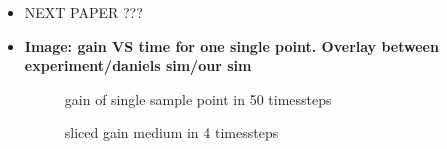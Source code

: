 \begin{itemize}

  \item NEXT PAPER ???

  \item \textbf{Image: gain VS time for one single point. Overlay between
    experiment/daniels sim/our sim}
    \begin{figure}[H]
      \centerline{
        }
      \caption{gain of single sample point in 50 timessteps}
      \label{plot:benchmark}
    \end{figure}
    \begin{figure}[H]
      \centerline{
        }
      \caption{sliced gain medium in 4 timessteps}
      \label{graphic:benchmark_4_timeslices}
    \end{figure}


\end{itemize}
